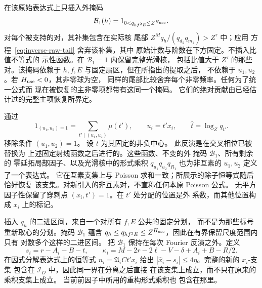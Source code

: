 在该原始表达式上只插入外掩码
\[
 \mathcal B_1(h)=1_{0<q_{hf^2E}\le Z^{H_{\rm use}}}.
\]
对每个被支持的对，其补集包含在实际核
尾部 \(Z^Mq_h/(q_{d_k}q_{m_1})>Z^\tau\) 中；应用
方程~\eqref{eq:inverse-raw-tail} 舍弃该补集，其中
原始计数与阶数在下方固定。不插入比值不等式的
示性函数。在 \(\mathcal B_1=1\) 内保留完整光滑核，
包括比值大于 \(Z^\tau\) 的那些对。该掩码依赖于
\(h,f,E\) 与固定扇区，但在所指出的提取之后，
不依赖于 \(u_1,u_2\)。若 \(H_{\rm use}<0\)，其非零球为空，
同样的尾部比较舍弃每个非零频率。任何为了统一公式而
现在被恢复的主非零项都带有这同一个掩码。
它们的绝对贡献由已经估计过的完整主项恢复所界定。

通过
\[
 1_{(u_1,u_2)=1}=\sum_{t'\mid(u_1,u_2)}\mu(t'),\qquad u_i=t'x_i,
 \qquad \widehat t=\log_Zq_{t'}.
\]
移除条件 \((u_1,u_2)=1\)。
设 \(t\) 为其固定的非负中心。
此反演是在交叉相位已被替换为
上述固定射线函数之后进行的。这些函数、不变的外
掩码 \(\mathcal B_1\)、所有剩余的
零延拓局部因子、以及光滑核中的形式乘积
\(q_{u_1}q_{u_2}q_{R_1}\) 也为非互素的 \(u_1,u_2\) 定义了一个表达式。
它在互素支集上与 Poisson 求和一致；所展示的除子恒等式随后恰好恢复
该支集。对新引入的非互素对，不宣称任何本原 Poisson 公式。
无平方因子性保留了穿刺点 \((x_i,t')=1\)。在 \(t'\) 处分配的位置是外
系数，而其他位置构成 \(x_i\) 上的标记。

插入 \(q_h\) 的二进区间，来自一个对所有 \(f,E\) 公共的固定分划，
而不是为那些标号重新取心的分划。掩码 \(\mathcal B_1\)
蕴含 \(q_h\le q_{hf^2E}\le Z^{H_{\rm use}}\)，因此在有界保留尺度范围内只有
对数多个这样的二进区间。
把 \(\mathcal B_1\) 保持在每次 Fourier 反演之外。定义
\[
 s_i=r-A_i-B-t,\qquad
 \kappa_i=M-2r-2\ell-V-\delta+A_i+B-R/2.
\]
在因式分解表达式上的恒等式 \(n_i=\mathfrak A_iCt'x_i\)
给出 \(|\widehat x_i-s_i|\le4\eta\)。完整的新的 \(x_i\)-支集
包含在 \(\mathcal I_D\) 中，因此同一界在分离之后直接
在该支集上成立，而不只在原来的乘积支集上成立。
当前前因子中所用的重构形式乘积也
包含在那里。

